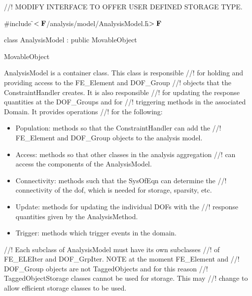 
//! MODIFY INTERFACE TO OFFER USER DEFINED STORAGE TYPE.

\indent \#include \f$<{\bf F}$/analysis/model/AnalysisModel.h\f$>{\bf F}$

\indent class AnalysisModel : public MovableObject

\indent MovableObject
\indent{}

\indent AnalysisModel is a container class. This class is responsible
//! for holding and providing access to the FE\_Element and DOF\_Group
//! objects that the ConstraintHandler creates. It is also responsible
//! for updating the response quantities at the DOF\_Groups and for
//! triggering methods in the associated Domain. It provides operations
//! for the following: \begin{itemize} 
\item Population: methods so that the ConstraintHandler can add the
//! FE\_Element and DOF\_Group objects to the analysis model. 
\item Access: methods so that other classes in the analysis aggregation
//! can access the components of the AnalysisModel. 
\item Connectivity: methods such that the SysOfEqn can determine the
//! connectivity of the dof, which is needed for storage, sparsity, etc.
\item Update: methods for updating the individual DOFs with the
//! response quantities given by the AnalysisMethod.
\item Trigger: methods which trigger events in the domain.
\end{itemize} 
//! Each subclass of AnalysisModel must have its own subclasses
//! of FE\_ELEIter and DOF\_GrpIter. NOTE at the moment FE\_Element and
//! DOF\_Group objects are not TaggedObjects and for this reason
//! TaggedObjectStorage classes cannot be used for storage. This may
//! change to allow efficient storage classes to be used.

